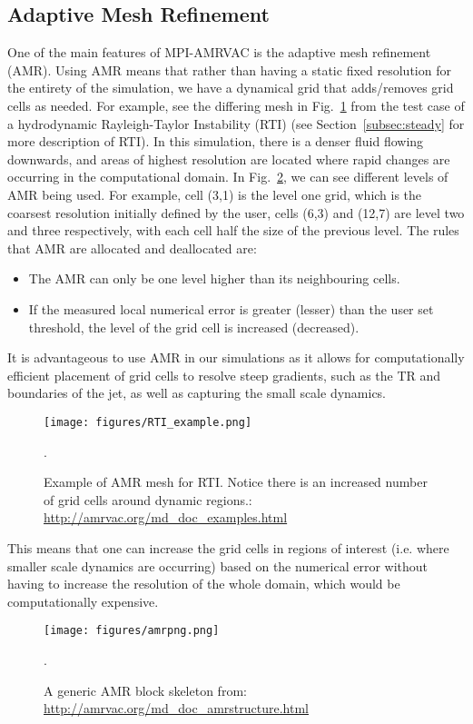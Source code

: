 \subsection{Adaptive Mesh Refinement}
\label{ssec:amr}
One of the main features of MPI-AMRVAC is the adaptive mesh refinement (AMR). Using AMR means that rather than having a static fixed resolution for the entirety of the simulation, we have a dynamical grid that adds/removes grid cells as needed. For example, see the differing mesh in Fig.~\ref{amr_example} from the test case of a hydrodynamic Rayleigh-Taylor Instability (RTI) (see Section~\ref{subsec:steady} for more description of RTI). In this simulation, there is a denser fluid flowing downwards, and areas of highest resolution are located where rapid changes are occurring in the computational domain. In Fig.~\ref{amr_scheme}, we can see different levels of AMR being used. For example, cell (3,1) is the level one grid, which is the coarsest resolution initially defined by the user, cells (6,3) and (12,7) are level two and three respectively, with each cell half the size of the previous level. The rules that AMR are allocated and deallocated are:
\begin{itemize}
    \item The AMR can only be one level higher than its neighbouring cells.
    \item If the measured local numerical error is greater (lesser) than the user set threshold, the level of the grid cell is increased (decreased).
\end{itemize}
It is advantageous to use AMR in our simulations as it allows for computationally efficient placement of grid cells to resolve steep gradients, such as the TR and boundaries of the jet, as well as capturing the small scale dynamics.  
\begin{figure}
\centering
\texttt{[image: figures/RTI\_example.png]}
\caption{Example of AMR mesh for RTI. Notice there is an increased number of grid cells around dynamic regions.: \url{http://amrvac.org/md_doc_examples.html}}.
\label{amr_example}
\end{figure}   
This means that one can increase the grid cells in regions of interest (i.e. where smaller scale dynamics are occurring) based on the numerical error without having to increase the resolution of the whole domain, which would be computationally expensive.
\begin{figure}
\centering
\texttt{[image: figures/amrpng.png]}
\caption{A generic AMR block skeleton from: \url{http://amrvac.org/md_doc_amrstructure.html}}.
\label{amr_scheme}
\end{figure}   
